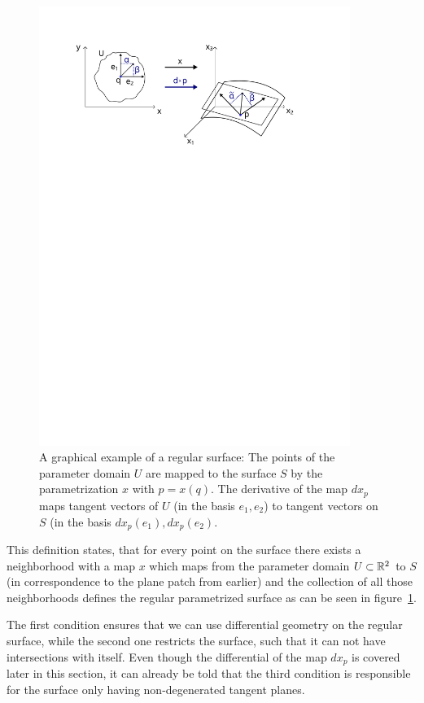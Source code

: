 \begin{figure}[h]
	\centering
	\includegraphics[width = 0.9\textwidth]{pictures/regular_surface}
	\caption{A graphical example of a regular surface: The points of the parameter domain $U$ are mapped to the surface $S$ by the parametrization $x$ with $p = x(q)$.
			The derivative of the map $dx_p$ maps tangent vectors of $U$ (in the basis $e_1,e_2$) to tangent vectors on $S$ (in the basis $dx_p(e_1), dx_p(e_2)$.}
	\label{fig:reg_surf}
\end{figure}
This definition states, that for every point on the surface there exists a neighborhood with a map $x$ which maps from the parameter domain $U \subset \mathbb{R}^2$ to $S$ (in correspondence to the plane patch from earlier) and the collection of all those neighborhoods defines the regular parametrized surface as can be seen in figure~\ref{fig:reg_surf}.
\begin{remark}
	The first condition ensures that we can use differential geometry on the regular surface, while the second one restricts the surface, such that it can not have intersections with itself.
	Even though the differential of the map $dx_p$ is covered later in this section, it can already be told that the third condition is responsible for the surface only having non-degenerated tangent planes.
\end{remark}

